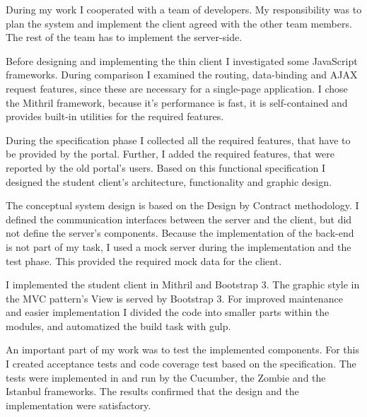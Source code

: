 During my work I cooperated with a team of developers. My responsibility was to plan the system and implement the client agreed with the other team members. The rest of the team has to implement the server-side.

Before designing and implementing the thin client I investigated some JavaScript frameworks. During comparison I examined the routing, data-binding and AJAX request features, since these are necessary for a single-page application. I chose the Mithril framework, because it's performance is fast, it is self-contained and provides built-in utilities for the required features.

During the specification phase I collected all the required features, that have to be provided by the portal. Further, I added the required features, that were reported by the old portal's users. Based on this functional specification I designed the student client's architecture, functionality and graphic design.

The conceptual system design is based on the Design by Contract methodology. I defined the communication interfaces between the server and the client, but did not define the server's components. Because the implementation of the back-end is not part of my task, I used a mock server during the implementation and the test phase. This provided the required mock data for the client.

I implemented the student client in Mithril and Bootstrap 3. The graphic style in the MVC pattern's View is served by Bootstrap 3. For improved maintenance and easier implementation I divided the code into smaller parts within the modules, and automatized the build task with gulp.

An important part of my work was to test the implemented components. For this I created acceptance tests and code coverage test based on the specification. The tests were implemented in and run by the Cucumber, the Zombie and the Istanbul frameworks. The results confirmed that the design and the implementation were satisfactory.


\vfill
\dolgozatnyelve
{}

\setcounter{romanPage}{\value{page}}
